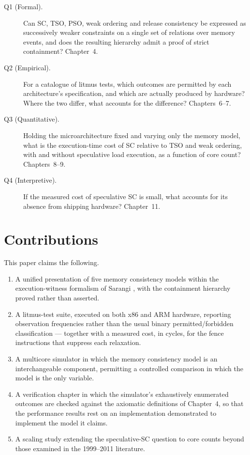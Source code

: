 \begin{description}
\item[Q1 (Formal).] Can SC, TSO, PSO, weak ordering and release consistency be
  expressed as successively weaker constraints on a single set of relations over
  memory events, and does the resulting hierarchy admit a proof of strict
  containment?
Chapter~4.

\item[Q2 (Empirical).] For a catalogue of litmus tests, which outcomes are
  permitted by each architecture's specification, and which are actually produced
  by hardware?
Where the two differ, what accounts for the difference?
  Chapters~6--7.

\item[Q3 (Quantitative).] Holding the microarchitecture fixed and varying only the
  memory model, what is the execution-time cost of SC relative to TSO and weak
  ordering, with and without speculative load execution, as a function of core
  count?
Chapters~8--9.

\item[Q4 (Interpretive).] If the measured cost of speculative SC is small, what
  accounts for its absence from shipping hardware?
Chapter~11.
\end{description}

\section{Contributions}
\label{sec:contributions}

This paper claims the following.

\begin{enumerate}
\item A unified presentation of five memory consistency models within the
  execution-witness formalism of Sarangi \cite{sarangi2023nextgen}, with the
  containment hierarchy proved rather than asserted.

\item A litmus-test suite, executed on both x86 and ARM hardware, reporting
  observation frequencies rather than the usual binary
  permitted/forbidden classification --- together with a measured cost, in
  cycles, for the fence instructions that suppress each relaxation.

\item A multicore simulator in which the memory consistency model is an
  interchangeable component, permitting a controlled comparison in which the
  model is the only variable.

\item A verification chapter in which the simulator's exhaustively enumerated
  outcomes are checked against the axiomatic definitions of Chapter~4, so that
  the performance results rest on an implementation demonstrated to implement
  the model it claims.

\item A scaling study extending the speculative-SC question to core counts beyond
  those examined in the 1999--2011 literature.
\end{enumerate}


